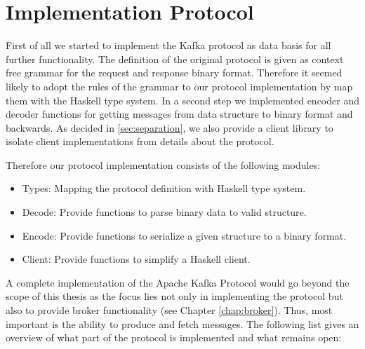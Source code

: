 \chapter{Implementation Protocol}
\label{sec-protocol}
First of all we started to implement the Kafka protocol 
as data basis for all further functionality. The definition of the original
protocol is given as context free grammar for the request and response binary
format. Therefore it seemed likely to adopt the rules of the grammar to our
protocol implementation by map them with the Haskell type system. In a second
step we implemented encoder and decoder functions for getting messages from data
structure to binary format and backwards. As decided in \ref{sec:separation}, we
also provide a client library to isolate client implementations from details
about the protocol. 

Therefore our protocol implementation consists of the following modules: 
\begin{itemize}
    \item {Types: Mapping the protocol definition with Haskell type system. }
    \item {Decode: Provide functions to parse binary data to valid structure. }
    \item {Encode: Provide functions to serialize a given structure to a binary
        format. }
    \item {Client: Provide functions to simplify a Haskell client.}
\end{itemize}


A complete implementation of the Apache Kafka Protocol would
go beyond the scope of this thesis as the focus lies not
only in implementing the protocol but also to provide broker
functionality (see Chapter \ref{chap:broker}). Thus, most important is
the ability to produce and fetch messages. The following list gives 
an overview of what part of the protocol is implemented and what remains open:

